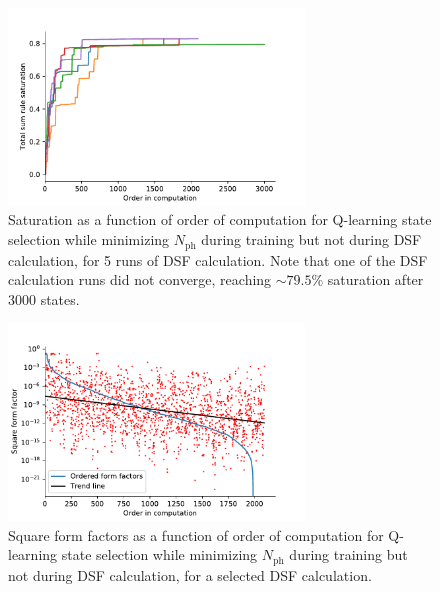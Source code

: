 \documentclass[11pt, a4paper]{report} %
\begin{document}
\begin{figure}[tb!]
  \centering
  \includegraphics[width=0.7\textwidth]{saturation_histories_rand_False_check_train_True_check_eval_False}
  \caption{Saturation as a function of order of computation for Q-learning state selection while minimizing \(N_{\mathrm{ph}}\) during training but not during DSF calculation, for 5 runs of DSF calculation. Note that one of the DSF calculation runs did not converge, reaching $\sim79.5\%$ saturation after 3000 states.}
  \label{fig:saturation_histories_rand_False_check_train_True_check_eval_False}
\end{figure}

\begin{figure}[tb!]
  \centering
  \includegraphics[width=0.7\textwidth]{ff_sizes_rand_False_check_train_True_check_eval_False.pdf}
  \caption{Square form factors as a function of order of computation for Q-learning state selection while minimizing \(N_{\mathrm{ph}}\) during training but not during DSF calculation, for a selected DSF calculation.}
  \label{fig:ff_sizes_rand_False_check_train_True_check_eval_False}
\end{figure}
\end{document}
